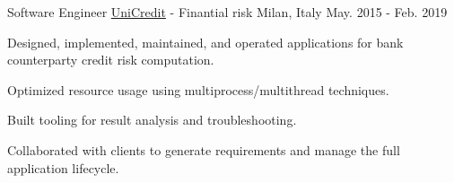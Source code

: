 \begin{cventries}
  \cventry
    {Software Engineer} %
    {\href{https://unicreditgroup.com/}{UniCredit} - Finantial risk} %
    {Milan, Italy} %
    {May. 2015 - Feb. 2019} %
    {
      \begin{cvitems} %
        \item {Designed, implemented, maintained, and operated applications for bank counterparty credit risk computation.}
        \item {Optimized resource usage using multiprocess/multithread techniques.}
        \item {Built tooling for result analysis and troubleshooting.}
        \item {Collaborated with clients to generate requirements and manage the full application lifecycle.}
      \end{cvitems}
    }

\end{cventries}
